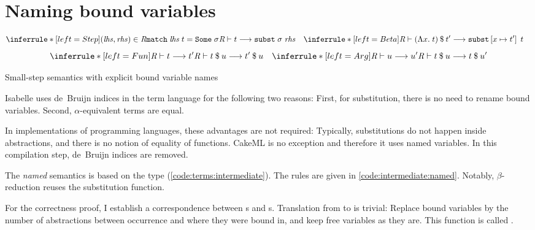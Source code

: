 
\section{Naming bound variables}
\label{sec:intermediate:named}


\begin{code}[t]
  \[
    \inferrule*[left=Step]{(\mathit{lhs}, \mathit{rhs}) \in \R \\ \holconst{match}\;\mathit{lhs}\;t = \holconst{Some}\;\sigma}{\rewrite{\R}{t}{\holconst{subst}\;\sigma\;\mathit{rhs}}}
    \quad
    \inferrule*[left=Beta]{ }{\rewrite{\R}{\app{(\Lambda x.\;t)}{t'}}{\holconst{subst}\left[x \mapsto t'\right]\;t}} \quad
  \]
  \[
    \inferrule*[left=Fun]{\rewrite{\R}{t}{t'}}{\rewrite{\R}{\app t u}{\app{t'}{u}}}
    \quad
    \inferrule*[left=Arg]{\rewrite{\R}{u}{u'}}{\rewrite{\R}{\app t u}{\app{t}{u'}}}
  \]
  \caption{Small-step semantics with explicit bound variable names}
  \label{code:intermediate:named}
\end{code}

\noindent
Isabelle uses de~Bruijn indices in the term language for the following two reasons:
First, for substitution, there is no need to rename bound variables.
Second, $\alpha$-equivalent terms are equal.

In implementations of programming languages, these advantages are not required:
Typically, substitutions do not happen inside abstractions, and there is no notion of equality of functions.
CakeML is no exception and therefore it uses named variables.
In this compilation step, de~Bruijn indices are removed.

The \emph{named} semantics is based on the  type (\cref{code:terms:intermediate}).
The rules are given in \cref{code:intermediate:named}.
Notably, $\beta$-reduction reuses the substitution function.

For the correctness proof, I establish a correspondence between s and s.
Translation from  to  is trivial:
Replace bound variables by the number of abstractions between occurrence and where they were bound in, and keep free variables as they are.
This function is called .

